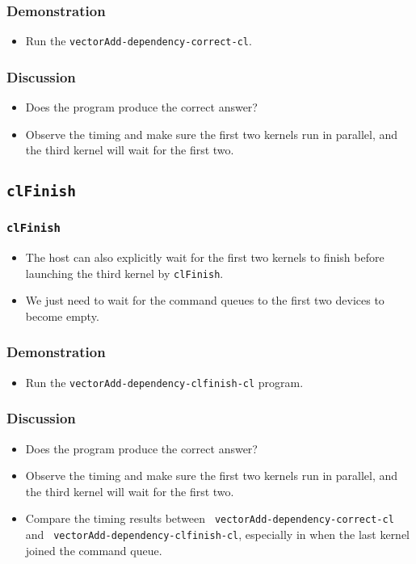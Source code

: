 \documentclass{beamer}
\begin{document}
\begin{frame}
  \frametitle{Demonstration}
  \begin{itemize}
    \item Run the {\tt vectorAdd-dependency-correct-cl}.
  \end{itemize}
\end{frame}

\begin{frame}
  \frametitle{Discussion}
  \begin{itemize}
    \item Does the program produce the correct answer?  
    \item Observe the timing and make sure the first two kernels run
      in parallel, and the third kernel will wait for the first two.
  \end{itemize}
\end{frame}

\subsection{\tt clFinish}

\begin{frame}
  \frametitle{\tt clFinish}
  \begin{itemize}
    \item The host can also explicitly wait for the first two kernels
      to finish before launching the third kernel by {\tt clFinish}.
    \item We just need to wait for the command queues to the first two
      devices to become empty.
  \end{itemize}
\end{frame}

\begin{frame}
\end{frame}

\begin{frame}
  \frametitle{Demonstration}
  \begin{itemize}
    \item Run the {\tt vectorAdd-dependency-clfinish-cl} program.
  \end{itemize}
\end{frame}

\begin{frame}
  \frametitle{Discussion}
  \begin{itemize}
    \item Does the program produce the correct answer?  
    \item Observe the timing and make sure the first two kernels run
      in parallel, and the third kernel will wait for the first two.
    \item Compare the timing results between {\tt
      vectorAdd-dependency-correct-cl} and {\tt
      vectorAdd-dependency-clfinish-cl}, especially in when the last
      kernel joined the command queue.
  \end{itemize}
\end{frame}
\end{document}
